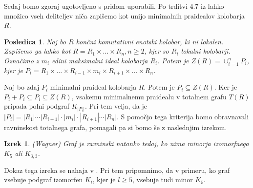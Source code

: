 \documentclass[a4paper, 12pt]{amsart}
\theoremstyle{definition} %
\theoremstyle{plain} %
\newtheorem{izrek}[definicija]{Izrek}
\newtheorem{posledica}[definicija]{Posledica}
\begin{document}
Sedaj bomo zgoraj ugotovljeno s pridom uporabili. Po trditvi 4.7 iz \cite{Atiyah} lahko množico vseh deliteljev niča zapišemo kot unijo minimalnih  praidealov kolobarja $R$.

\begin{posledica}
\label{deliteljiNicaUnijaMinPra}
Naj bo $R$ končni komutativni enotski kolobar, ki ni lokalen. Zapišemo ga lahko kot $R = R_1 \times \dots \times R_n, n\ge2$, kjer so $R_i$ lokalni kolobarji. Označimo z $m_i$ edini maksimalni ideal kolobarja $R_i$. Potem je $Z(R) = \cup_{i=1}^n P_i$, kjer je $P_i = R_1 \times \dots \times R_{i-1} \times m_i \times R_{i+1} \times \dots \times R_n$.
\end{posledica}

Naj bo zdaj $P_i$ minimalni praideal kolobarja $R$. Potem je $P_i \subseteq Z(R)$. Ker je $P_i + P_i \subseteq P_i \subseteq Z(R)$, vsakemu minimalnemu praidealu v totalnem grafu $T(R)$ pripada polni podgraf $K_{|P_i|}$. Pri tem velja, da je $|P_i| = |R_1|\cdots |R_{i-1}| \cdot |m_i| \cdot |R_{i+1}| \cdots |R_n|$.
S pomočjo tega kriterija bomo obravnavali ravninskost totalnega grafa, pomagali pa si bomo še z naslednjim izrekom.

\begin{izrek}(Wagner)
Graf je ravninski natanko tedaj, ko nima minorja izomorfnega $K_5$ ali $K_{3,3}$.
\end{izrek}
Dokaz tega izreka se nahaja v \cite[Izrek 4.2.9]{Diestel}. Pri tem pripomnimo, da v primeru, ko graf vsebuje podgraf izomorfen $K_l$, kjer je $l\ge5$, vsebuje tudi minor $K_5$.
\end{document}
